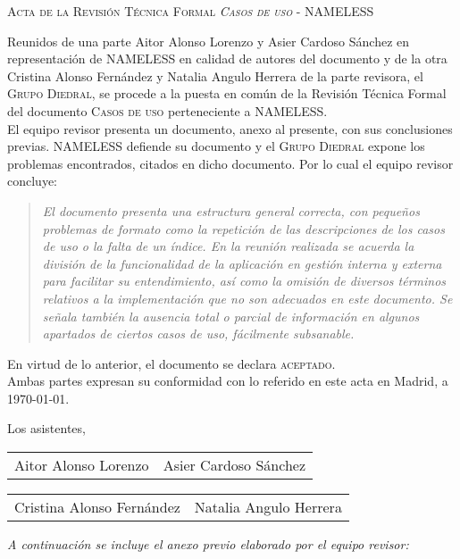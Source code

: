 \documentclass[11pt, a4paper, twoside]{article}
\begin{document}
	\begin{center}
		\scshape \large Acta de la Revisión Técnica Formal \textit{Casos de uso} - NAMELESS
	\end{center}

	Reunidos de una parte Aitor Alonso Lorenzo y Asier Cardoso Sánchez en representación de NAMELESS en calidad de autores del documento y de la otra Cristina Alonso Fernández y Natalia Angulo Herrera de la parte revisora, el \textsc{Grupo Diedral}, se procede a la puesta en común de la Revisión Técnica Formal del documento \textsc{Casos de uso} perteneciente a NAMELESS. \\

	El equipo revisor presenta un documento, anexo al presente, con sus conclusiones previas. NAMELESS defiende su documento y el \textsc{Grupo Diedral} expone los problemas encontrados, citados en dicho documento. Por lo cual el equipo revisor concluye:

\begin{quotation} \itshape
	El documento presenta una estructura general correcta, con pequeños problemas de formato como la repetición de las descripciones de los casos de uso o la falta de un índice. En la reunión realizada se acuerda la división de la funcionalidad de la aplicación en gestión interna y externa para facilitar su entendimiento, así como la omisión de diversos términos relativos a la implementación que no son adecuados en este documento. Se señala también la ausencia total o parcial de información en algunos apartados de ciertos casos de uso, fácilmente subsanable.
\end{quotation}

\noindent
En virtud de lo anterior, el documento se declara \textsc{aceptado}.\\

	Ambas partes expresan su conformidad con lo referido en este acta en Madrid, a \today.

\begin{flushleft}
	Los asistentes,
\end{flushleft}

\vspace{1cm}

	\begin{tabu} to .9\linewidth {X[1,c] X[1, c]}
		Aitor Alonso Lorenzo & Asier Cardoso Sánchez
	\end{tabu}

	\vfill

	\begin{tabu} to .9\linewidth {X[1,c] X[1, c]}
		Cristina Alonso Fernández & Natalia Angulo Herrera
	\end{tabu}
	
	\vfill
	{\itshape A continuación se incluye el anexo previo elaborado por el equipo revisor: }

	
\end{document}
